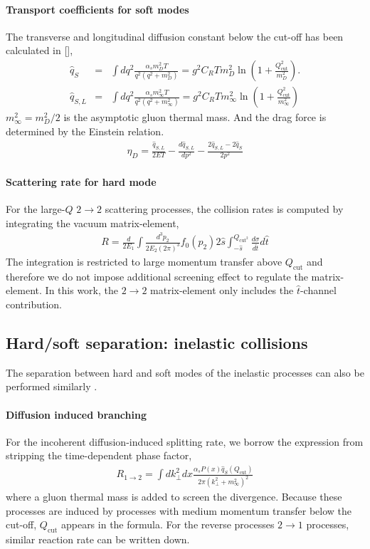 \paragraph{Transport coefficients for soft modes} The transverse and longitudinal diffusion constant below the cut-off has been calculated in [],
\begin{eqnarray}
\hat{q}_S &=& \int dq^2 \frac{\alpha_s m_D^2 T}{q^2 (q^2+m_D^2)} = g^2 C_R T m_D^2  \ln\left(1+\frac{Q_{\textrm{cut}}^2}{m_D^2}\right).
\label{eq:qS} \\
\hat{q}_{S,L} &=& \int dq^2 \frac{\alpha_s m_\infty^2 T}{q^2 (q^2+m_\infty^2)} = g^2 C_R T m_\infty^2  \ln\left(1+\frac{Q_{\textrm{cut}}^2}{m_\infty^2}\right)
\label{eq:qSL} 
\end{eqnarray}
$m_\infty^2 = m_D^2/2$ is the asymptotic gluon thermal mass. 
And the drag force is determined by the Einstein relation.
\begin{eqnarray}
\eta_D = \frac{\hat{q}_{S,L}}{2ET} - \frac{d\hat{q}_{S,L}}{dp^2} - \frac{2\hat{q}_{S,L} - 2\hat{q}_S}{2p^2}
\end{eqnarray}

\paragraph{Scattering rate for hard mode} For the large-$Q$ $2\rightarrow 2$ scattering processes, the collision rates is computed by integrating the vacuum matrix-element, 
\begin{eqnarray}
R = \frac{d}{2E_1}\int  \frac{d^3p_2}{2E_2(2\pi)^3} f_0(p_2)2\hat{s} \int_{-\hat{s}}^{Q_{\textrm{cut}^2}}\frac{d\sigma}{d\hat{t}}d\hat{t}
\end{eqnarray}
The integration is restricted to large momentum transfer above $Q_{\textrm{cut}}$ and therefore we do not impose additional screening effect to regulate the matrix-element.
In this work, the $2\rightarrow 2$ matrix-element only includes the $\hat{t}$-channel contribution.

\subsection{Hard/soft separation: inelastic collisions}
The separation between hard and soft modes of the inelastic processes can also be performed similarly .

\paragraph{Diffusion induced branching} For the incoherent diffusion-induced splitting rate, we borrow the expression from \cite{Cao:2017hhk} stripping the time-dependent phase factor,
\begin{eqnarray}
R_{1\rightarrow 2} = \int d k_\perp^2 dx \frac{\alpha_s P(x) \hat{q}_S(Q_{\textrm{cut}})}{2\pi (k_\perp^2 + m_\infty^2)^2}
\end{eqnarray}
where a gluon thermal mass is added to screen the divergence.
Because these processes are induced by processes with medium momentum transfer below the cut-off, $Q_{\textrm{cut}}$ appears in the formula.
For the reverse processes $2\rightarrow 1$ processes, similar reaction rate can be written down.

